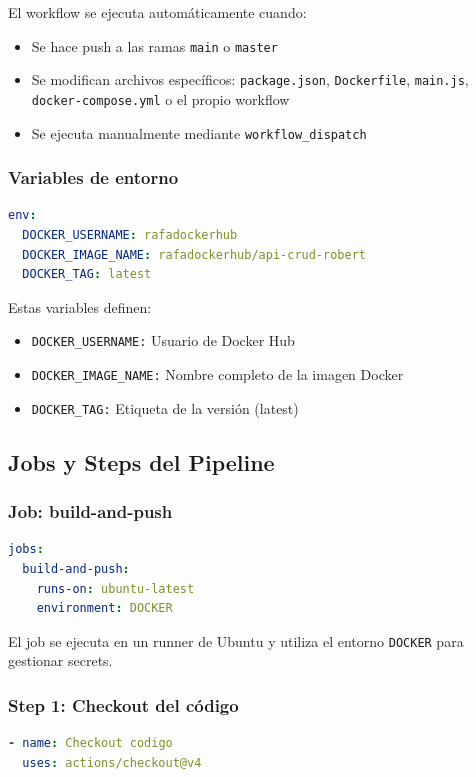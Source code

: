 \documentclass{article}
\begin{document}
El workflow se ejecuta automáticamente cuando:
\begin{itemize}
    \item Se hace push a las ramas \texttt{main} o \texttt{master}
    \item Se modifican archivos específicos: \texttt{package.json}, \texttt{Dockerfile}, \texttt{main.js}, \texttt{docker-compose.yml} o el propio workflow
    \item Se ejecuta manualmente mediante \texttt{workflow\_dispatch}
\end{itemize}

\subsubsection{Variables de entorno}
\begin{lstlisting}[language=yaml,caption={Variables de entorno del workflow}]
env:
  DOCKER_USERNAME: rafadockerhub
  DOCKER_IMAGE_NAME: rafadockerhub/api-crud-robert
  DOCKER_TAG: latest
\end{lstlisting}

Estas variables definen:
\begin{itemize}
    \item \texttt{DOCKER\_USERNAME:} Usuario de Docker Hub
    \item \texttt{DOCKER\_IMAGE\_NAME:} Nombre completo de la imagen Docker
    \item \texttt{DOCKER\_TAG:} Etiqueta de la versión (latest)
\end{itemize}

\subsection{Jobs y Steps del Pipeline}

\subsubsection{Job: build-and-push}
\begin{lstlisting}[language=yaml,caption={Configuración del job principal}]
jobs:
  build-and-push:
    runs-on: ubuntu-latest
    environment: DOCKER
\end{lstlisting}

El job se ejecuta en un runner de Ubuntu y utiliza el entorno \texttt{DOCKER} para gestionar secrets.

\subsubsection{Step 1: Checkout del código}
\begin{lstlisting}[language=yaml,caption={Obtener el código del repositorio}]
- name: Checkout codigo
  uses: actions/checkout@v4
\end{lstlisting}
\end{document}

